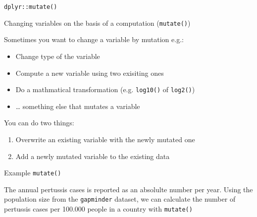 \documentclass[ignorenonframetext,]{beamer}
\newenvironment{Shaded}{\begin{snugshade}}{\end{snugshade}}
\newcommand{\DataTypeTok}[1]{\textcolor[rgb]{0.13,0.29,0.53}{#1}}
\newcommand{\DecValTok}[1]{\textcolor[rgb]{0.00,0.00,0.81}{#1}}
\newcommand{\KeywordTok}[1]{\textcolor[rgb]{0.13,0.29,0.53}{\textbf{#1}}}
\newcommand{\NormalTok}[1]{#1}
\newcommand{\OperatorTok}[1]{\textcolor[rgb]{0.81,0.36,0.00}{\textbf{#1}}}
\newcommand{\StringTok}[1]{\textcolor[rgb]{0.31,0.60,0.02}{#1}}
\providecommand{\tightlist}{%
  \setlength{\itemsep}{0pt}\setlength{\parskip}{0pt}}
\begin{document}
\begin{frame}[fragile]{\texttt{dplyr::mutate()}}
\protect\hypertarget{dplyrmutate}{}

\begin{block}{Changing variables on the basis of a computation
(\texttt{mutate()})}

Sometimes you want to change a variable by mutation e.g.:

\begin{itemize}
\tightlist
\item
  Change type of the variable
\item
  Compute a new variable using two exisiting ones
\item
  Do a mathmatical transformation (e.g. \texttt{log10()} of
  \texttt{log2()})
\item
  \ldots{} something else that mutates a variable
\end{itemize}

You can do two things:

\begin{enumerate}
[1)]
\tightlist
\item
  Overwrite an existing variable with the newly mutated one
\item
  Add a newly mutated variable to the existing data
\end{enumerate}

\end{block}

\begin{block}{Example \texttt{mutate()}}

The annual pertussis cases is reported as an absolulte number per year.
Using the population size from the \texttt{gapminder} dataset, we can
calculate the number of pertussis cases per 100.000 people in a country
with \texttt{mutate()}

\begin{Shaded}
\end{Shaded}


\end{block}
\end{frame}
\end{document}
